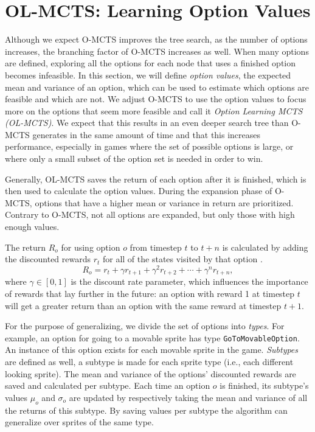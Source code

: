 \section{OL-MCTS: Learning Option Values} 
\label{sec:learning} 
Although we expect O-MCTS improves the tree search, as the number of options
increases, the branching factor of O-MCTS increases as well. When many
options are defined, exploring all the options for each node that uses a
finished option becomes infeasible. In this section, we will define \emph{option
values}, the expected mean and variance of an option, which can be used to
estimate which options are feasible and which are not. We adjust O-MCTS to use
the option values to focus more on the options that seem more feasible and call
it \emph{Option Learning MCTS (OL-MCTS)}. We expect that this results in an even
deeper search tree than O-MCTS generates in the same amount of time and that
this increases performance, especially in games where the set of possible
options is large, or where only a small subset of the option set is needed in
order to win.

Generally, OL-MCTS saves the return of each option after it is finished, which
is then used to calculate the option values. During the expansion phase of O-MCTS,
options that have a higher mean or variance in return are prioritized. Contrary
to O-MCTS, not all options are expanded, but only those with high enough values.

The return $R_o$ for using option $o$ from timestep $t$ to $t+n$ is calculated
by adding the discounted rewards $r_t$ for all of the states visited by that
option \cite{sutton1999between}. $$R_o = r_{t} + \gamma r_{t+1} + \gamma^2 r_{t+2} + \cdots + \gamma^n
r_{t+n},$$ where $\gamma \in [0, 1]$ is the discount rate parameter, which
influences the importance of rewards that lay further in the future: an option
with reward 1 at timestep $t$ will get a greater return than an option with the
same reward at timestep $t+1$.  

For the purpose of generalizing, we divide the set of options into \emph{types}.
For example, an option for going to a movable sprite has type
\texttt{GoToMovableOption}. An instance of this option exists for each movable
sprite in the game. \emph{Subtypes} are defined as well, a subtype is made for
each sprite type (i.e., each different looking sprite). The mean and variance of
the options' discounted rewards are saved and calculated per subtype. Each time
an option $o$ is finished, its subtype's values $\mu_o$ and $\sigma_o$ are
updated by respectively taking the mean and variance of all the returns of this
subtype. By saving values per subtype the algorithm can generalize over sprites
of the same type.

